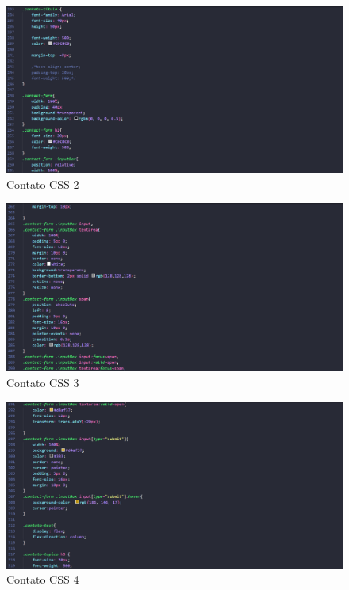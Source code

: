 \begin{figure}[!h]
	\centering
	\includegraphics[width=15cm]{Contato CSS 2}
	\caption{Contato CSS 2}
\end{figure}

\begin{figure}[!h]
	\centering
	\includegraphics[width=15cm]{Contato CSS 3}
	\caption{Contato CSS 3}
\end{figure}

\begin{figure}[!h]
	\centering
	\includegraphics[width=15cm]{Contato CSS 4}
	\caption{Contato CSS 4}
\end{figure}

